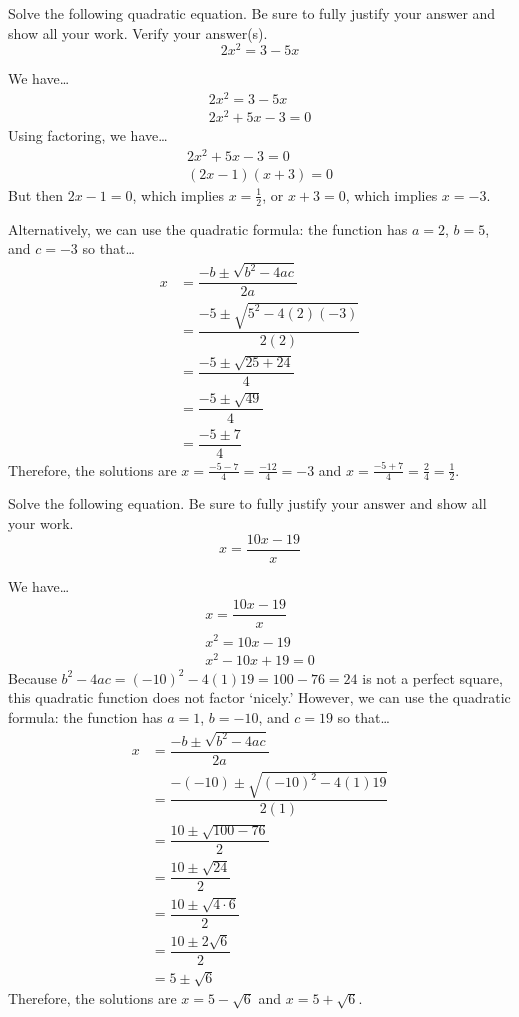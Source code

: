 \documentclass[11pt,letterpaper]{article}
\begin{document}
 Solve the following quadratic equation. Be sure to fully justify your answer and show all your work. Verify your answer(s).
	\[
	2x^2= 3 - 5x
	\] \pspace

\sol We have\dots
	\[
	\begin{gathered}
	2x^2= 3 - 5x \\[0.3cm]
	2x^2 + 5x - 3= 0 
	\end{gathered}
	\]
Using factoring, we have\dots
	\[
	\begin{gathered}
	2x^2 + 5x - 3= 0 \\[0.3cm]
	(2x - 1)(x + 3)= 0 
	\end{gathered}
	\]
But then $2x - 1= 0$, which implies $x= \frac{1}{2}$, or $x + 3= 0$, which implies $x= -3$. \pspace

Alternatively, we can use the quadratic formula: the function has $a= 2$, $b= 5$, and $c= -3$ so that\dots
	\[
	\begin{aligned}
	x&= \dfrac{-b \pm \sqrt{b^2 - 4ac}}{2a} \\[0.3cm]
	&= \dfrac{-5 \pm \sqrt{5^2 - 4(2)(-3)}}{2(2)} \\[0.3cm]
	&= \dfrac{-5 \pm \sqrt{25 + 24}}{4} \\[0.3cm]
	&= \dfrac{-5 \pm \sqrt{49}}{4} \\[0.3cm]
	&= \dfrac{-5 \pm 7}{4}
	\end{aligned}
	\]
Therefore, the solutions are $x= \frac{-5 - 7}{4}= \frac{-12}{4}= -3$ and $x= \frac{-5 + 7}{4}= \frac{2}{4}= \frac{1}{2}$. 



\newpage



 Solve the following equation. Be sure to fully justify your answer and show all your work.
	\[
	x= \dfrac{10x - 19}{x}
	\] \pspace

\sol We have\dots
	\[
	\begin{gathered}
	x= \dfrac{10x - 19}{x} \\[0.3cm]
	x^2= 10x - 19 \\[0.3cm]
	x^2 - 10x + 19= 0 
	\end{gathered}
	\]
Because $b^2 - 4ac= (-10)^2 - 4(1)19= 100 - 76= 24$ is not a perfect square, this quadratic function does not factor `nicely.' However, we can use the quadratic formula: the function has $a= 1$, $b= -10$, and $c= 19$ so that\dots
	\[
	\begin{aligned}
	x&= \dfrac{-b \pm \sqrt{b^2 - 4ac}}{2a} \\[0.3cm]
	&= \dfrac{-(-10) \pm \sqrt{(-10)^2 - 4(1)19}}{2(1)} \\[0.3cm]
	&= \dfrac{10 \pm \sqrt{100 - 76}}{2} \\[0.3cm]
	&= \dfrac{10 \pm \sqrt{24}}{2} \\[0.3cm]
	&= \dfrac{10 \pm \sqrt{4 \cdot 6}}{2} \\[0.3cm]
	&= \dfrac{10 \pm 2 \sqrt{6}}{2} \\[0.3cm]
	&= 5 \pm \sqrt{6}
	\end{aligned}
	\]
Therefore, the solutions are $x= 5 - \sqrt{6}$ and $x= 5 + \sqrt{6}$. 
 
\end{document}
